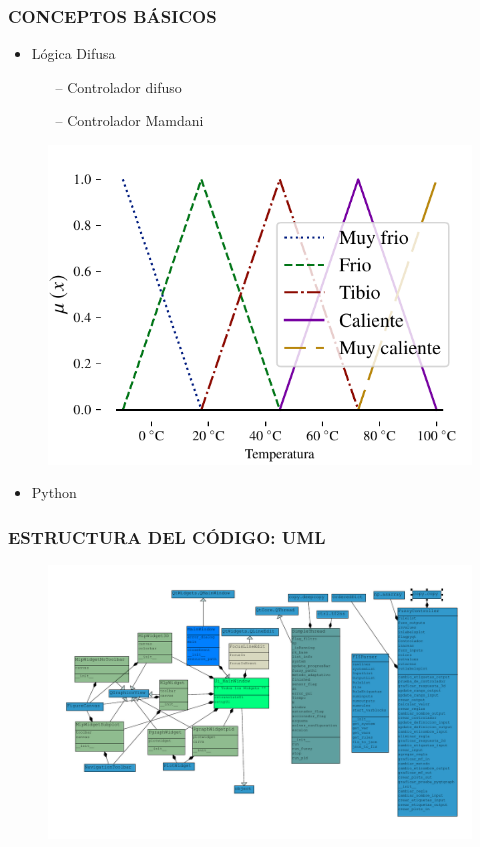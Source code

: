 \documentclass[usenames,xcolor={dvipsnames, table}]{beamer}
\begin{document}
\begin{frame}
	\frametitle{CONCEPTOS BÁSICOS}
	\vspace{25pt}

	\begin{itemize}
		\Large
		\setlength\itemsep{1em}
		\item Lógica Difusa
		\begin{itemize}
			\large
			\vspace{0.2em}
			\item[--] Controlador difuso
			\item[--] Controlador Mamdani 
		\end{itemize}
	\end{itemize}

	\begin{figure}
		\includegraphics[width=0.6\linewidth]{imagenes/FuzzySet.pdf}
	\end{figure}
	\vspace{-20pt}
	\begin{itemize}
		\Large
		\item Python
	\end{itemize}

\end{frame}

\begin{frame}
	\frametitle{ESTRUCTURA DEL CÓDIGO: UML}
	\vspace{20pt}
	\begin{figure}
		\includegraphics[width=\linewidth]{imagenes/UMLsinHandlers.pdf}
	\end{figure}
\end{frame}
\end{document}
